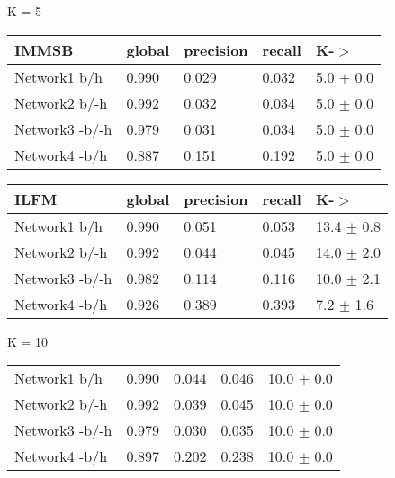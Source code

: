 

\begin{table*}[h] \label{table:unbalanced}
\caption{Predictive Performance on a UnBalanced Testing set}
	\begin{minipage}[h]{0.45\linewidth} 
K = 5\hspace{5pt}
\begin{tabular}{lllll}
\hline
 IMMSB   &   global &   precision &   recall &    K-\ensuremath{>} \\
\hline
 Network1 b/h         &    0.990 &       0.029 &    0.032 & 5.0 $\pm$ 0.0 \\
 Network2 b/-h       &    0.992 &       0.032 &    0.034 & 5.0 $\pm$ 0.0 \\
 Network3 -b/-h       &    0.979 &       0.031 &    0.034 & 5.0 $\pm$ 0.0 \\
 Network4 -b/h       &    0.887 &       0.151 &    0.192 & 5.0 $\pm$ 0.0 \\

\hline
\end{tabular}
\end{minipage}
\hspace{0.8cm}
\begin{minipage}[h]{0.45\linewidth}
\begin{tabular}{lllll}
\hline
  ILFM & global &   precision &   recall &     K-\ensuremath{>} \\
\hline
 Network1 b/h       &    0.990 &       0.051 &    0.053 & 13.4 $\pm$ 0.8    \\
 Network2 b/-h     &    0.992 &       0.044 &    0.045 & 14.0 $\pm$ 2.0    \\
 Network3 -b/-h     &    0.982 &       0.114 &    0.116 & 10.0 $\pm$ 2.1 \\
 Network4 -b/h     &    0.926 &       0.389 &    0.393 & 7.2 $\pm$ 1.6     \\

\hline
\end{tabular}
\end{minipage}


	\begin{minipage}[h]{0.45\linewidth} 
K = 10
\begin{tabular}{lllll}
Network1 b/h         &    0.990 &       0.044 &    0.046 & 10.0 $\pm$ 0.0 \\
 Network2 b/-h       &    0.992 &       0.039 &    0.045 & 10.0 $\pm$ 0.0 \\
 Network3 -b/-h       &    0.979 &       0.030 &    0.035 & 10.0 $\pm$ 0.0 \\
 Network4 -b/h       &    0.897 &       0.202 &    0.238 & 10.0 $\pm$ 0.0 \\


\end{tabular}
\end{minipage}
\end{table*}
